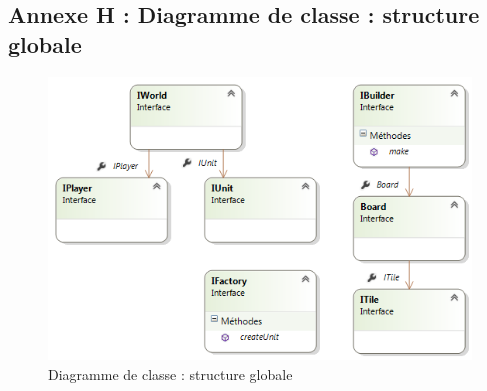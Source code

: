 \subsection{Annexe H : Diagramme de classe : structure globale}
\begin{figure}[!h]
\centering
\label{structure}
\includegraphics[width=1\textwidth]{img/Interfaces.png}
\caption{Diagramme de classe : structure globale}
\end{figure}
\clearpage


